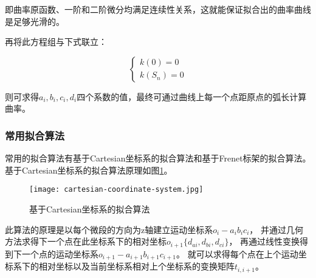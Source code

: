 \begin{enumerate}[label=(\Alph*)]
    即曲率原函数、一阶和二阶微分均满足连续性关系，这就能保证拟合出的曲率曲线是足够光滑的。

    再将此方程组与下式联立：

    \begin{equation}
    \left\{
        \begin{array}{lr}
        k(0) = 0
    \\
        k(S_n) = 0
        \end{array}
    \right.
    \end{equation}

    则可求得$a_i, b_i, c_i, d_i$四个系数的值，最终可通过曲线上每一个点距原点的弧长计算曲率。
\end{enumerate}

\subsubsection{常用拟合算法}
\FloatBarrier
常用的拟合算法有基于Cartesian坐标系的拟合算法和基于Frenet标架的拟合算法。
基于Cartesian坐标系的拟合算法原理如图\ref{fig:cartesian}。

\begin{figure}[b!]
\centering
\texttt{[image: cartesian-coordinate-system.jpg]}
\caption{基于Cartesian坐标系的拟合算法\cite{用于光纤光栅曲线重建算法的坐标点拟合}}
\label{fig:cartesian}
\end{figure}

此算法的原理是以每个微段的方向为z轴建立运动坐标系$o_i-a_ib_ic_i$，
并通过几何方法求得下一个点在此坐标系下的相对坐标\cite{3d-shape-display}$o_{i+1} \{d_{ai}, d_{bi}, d_{ci}\}$，
再通过线性变换得到下一个点的运动坐标系\cite{three-dimensional-curve}$o_{i+1}-a_{i+1}b_{i+1} c_{i+1}$。
就可以求得每个点在上个运动坐标系下的相对坐标以及当前坐标系相对上个坐标系的变换矩阵$t_{i, i+1}$。

\FloatBarrier

